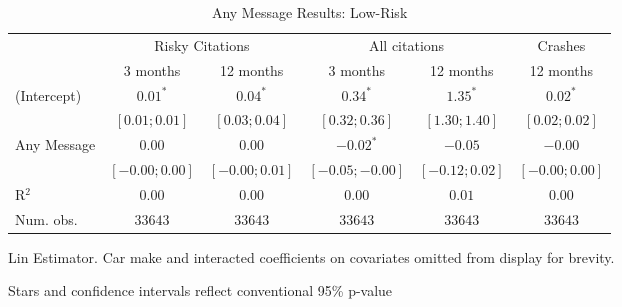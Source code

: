 
\begin{table}
\caption{Any Message Results: Low-Risk}
\begin{center}
\begin{threeparttable}
\begin{tabular}{l c c c c c}
\hline
 & \multicolumn{2}{c}{Risky Citations} & \multicolumn{2}{c}{All citations} & \multicolumn{1}{c}{Crashes} \\
\cline{2-3} \cline{4-5} \cline{6-6}
 & 3 months & 12 months & 3 months & 12 months & 12 months \\
\hline
(Intercept) & $0.01^{*}$       & $0.04^{*}$       & $0.34^{*}$        & $1.35^{*}$       & $0.02^{*}$       \\
            & $ [ 0.01; 0.01]$ & $ [ 0.03; 0.04]$ & $ [ 0.32;  0.36]$ & $ [ 1.30; 1.40]$ & $ [ 0.02; 0.02]$ \\
Any Message & $0.00$           & $0.00$           & $-0.02^{*}$       & $-0.05$          & $-0.00$          \\
            & $ [-0.00; 0.00]$ & $ [-0.00; 0.01]$ & $ [-0.05; -0.00]$ & $ [-0.12; 0.02]$ & $ [-0.00; 0.00]$ \\
\hline
R$^2$       & $0.00$           & $0.00$           & $0.00$            & $0.01$           & $0.00$           \\
Num. obs.   & $33643$          & $33643$          & $33643$           & $33643$          & $33643$          \\
\hline
\end{tabular}
\begin{tablenotes}[flushleft]
\scriptsize{\item Lin Estimator. Car make and interacted coefficients on covariates omitted from display for brevity.
                             \item Stars and confidence intervals reflect conventional 95\% p-value}
\end{tablenotes}
\end{threeparttable}
\label{table:coefficients}
\end{center}
\end{table}
